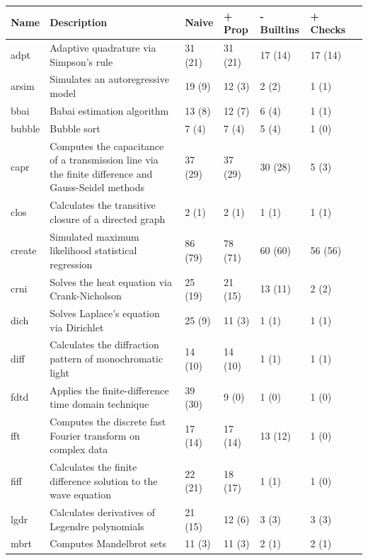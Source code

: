\begin{table}
  \begin{tabular}{| l | p{8.5cm} | l | l | l | l | l |}
  \hline
  Name & Description & Naive & + Prop & - Builtins & + Checks \\ \hline

  adpt        & Adaptive quadrature via Simpson's rule & 31 (21) & 31 (21) & 17 (14)& 17 (14) \\ \hline
  arsim       & Simulates an autoregressive model & 19 (9) & 12 (3) & 2 (2) & 1 (1) \\ \hline
  bbai        & Babai estimation algorithm & 13 (8) & 12 (7) & 6 (4) & 1 (1) \\ \hline
  bubble      & Bubble sort & 7 (4) & 7 (4) & 5 (4) & 1 (0) \\ \hline
  capr        & Computes the capacitance of a transmission line via the finite difference and Gauss-Seidel methods & 37 (29) & 37 (29) & 30 (28) & 5 (3) \\ \hline
  clos        & Calculates the transitive closure of a directed graph & 2 (1) & 2 (1) & 1 (1) & 1 (1) \\ \hline
  create      & Simulated maximum likelihood statistical regression & 86 (79) & 78 (71) & 60 (60) & 56 (56) \\ \hline
  crni        & Solves the heat equation via Crank-Nicholson & 25 (19) & 21 (15) & 13 (11) & 2 (2) \\ \hline
  dich        & Solves Laplace's equation via Dirichlet & 25 (9) & 11 (3) & 1 (1) & 1 (1)  \\ \hline
  diff        & Calculates the diffraction pattern of monochromatic light & 14 (10) & 14 (10) & 1 (1) & 1 (1) \\ \hline
  fdtd        & Applies the finite-difference time domain technique & 39 (30) & 9 (0) & 1 (0) & 1 (0) \\ \hline
  fft         & Computes the discrete fast Fourier transform on complex data & 17 (14) & 17 (14) & 13 (12) & 1 (0) \\ \hline
  fiff        & Calculates the finite difference solution to the wave equation & 22 (21) & 18 (17) & 1 (1) & 1 (0) \\ \hline
  lgdr        & Calculates derivatives of Legendre polynomials & 21 (15) & 12 (6) & 3 (3) & 3 (3) \\ \hline
  mbrt        & Computes Mandelbrot sets & 11 (3) & 11 (3) & 2 (1) & 2 (1) \\ \hline

\end{tabular}
\end{table}
